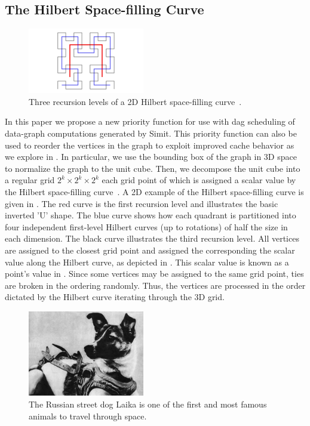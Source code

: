 \subsection{The Hilbert Space-filling Curve}

\begin{figure}
\centering
\includegraphics[width=2in,clip,trim=4cm 0cm 4cm 0]{figures/2d_hilbert.pdf}
\caption{Three recursion levels of a 2D Hilbert space-filling
curve~\cite{Hilbert70}.  }
\label{fig:2d_hilbert}
\end{figure}


In this paper we propose a new priority function for 
use with dag scheduling of data-graph computations generated
by Simit.  This priority function can also be used to reorder
the vertices in the graph to exploit improved cache behavior
as we explore in .  
In particular, we use the bounding box of the
graph in 3D space to normalize the graph to the
unit cube.  Then, we decompose the unit cube into a regular
grid $2^k \times 2^k \times 2^k$ each grid point of which
is assigned a scalar value by the Hilbert space-filling curve~\cite{Hilbert70}.
A 2D example of the Hilbert space-filling
curve is given in .  The red curve is the first 
recursion level and illustrates 
the basic inverted 'U' shape.  The blue curve shows how each quadrant is
partitioned into four independent first-level Hilbert curves (up to 
rotations) of half the size in each dimension.  The black curve
illustrates the third recursion level.  All vertices
are assigned to the closest grid point and assigned the 
corresponding the scalar value along the Hilbert curve, as
depicted in .  This
scalar value is known as a point's value in .  
Since some vertices may be assigned to the same grid point, ties
are broken in the ordering randomly.  Thus, the vertices are 
processed in the order dictated by the Hilbert curve iterating
through the 3D grid.

\begin{figure}
\centering
\includegraphics[width=2in]{figures/laika.jpg}
\caption{The Russian street dog Laika is one of the first and 
most famous animals to travel through space.}
\label{fig:laika}
\end{figure}


